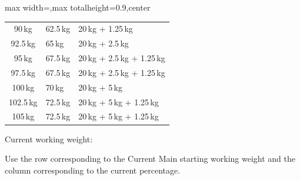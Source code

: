 \documentclass[11pt,a4paper]{article}
\begin{document}
\begin{center}
\begin{adjustbox}{max width=\linewidth,max totalheight=0.9\textheight,center}
\begin{tabular}{cll}
90\,kg   & 62.5\,kg & 20\,kg + 1.25\,kg \\
92.5\,kg & 65\,kg   & 20\,kg + 2.5\,kg \\
95\,kg   & 67.5\,kg & 20\,kg + 2.5\,kg + 1.25\,kg \\
97.5\,kg & 67.5\,kg & 20\,kg + 2.5\,kg + 1.25\,kg \\
100\,kg  & 70\,kg   & 20\,kg + 5\,kg \\
102.5\,kg& 72.5\,kg & 20\,kg + 5\,kg + 1.25\,kg \\
105\,kg  & 72.5\,kg & 20\,kg + 5\,kg + 1.25\,kg \\
\bottomrule
\end{tabular}
\end{adjustbox}
\renewcommand{\arraystretch}{1}
\end{center}

Current working weight:

Use the row corresponding to the Current Main starting working weight and the column corresponding to the current percentage.
\end{document}
